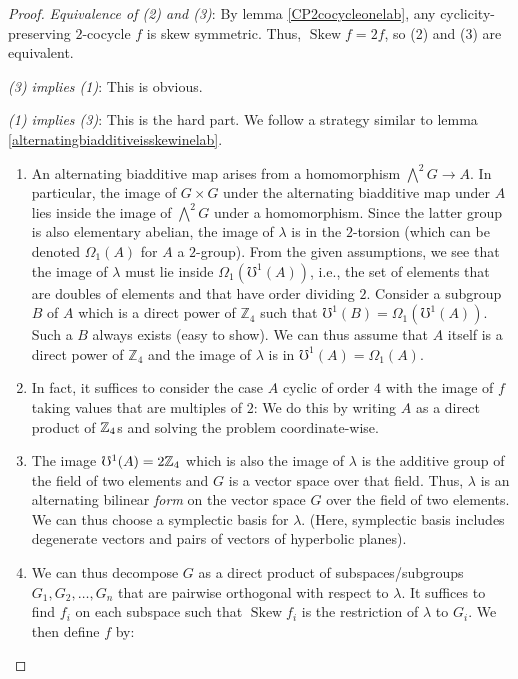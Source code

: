\documentclass[10pt]{amsart}
\newcommand{\Skew}{\operatorname{Skew}}
\begin{document}
\begin{proof}
  {\em Equivalence of (2) and (3)}: By lemma \ref{CP2cocycleonelab},
  any cyclicity-preserving $2$-cocycle $f$ is skew symmetric. Thus,
  $\Skew f = 2f$, so (2) and (3) are equivalent.

  {\em (3) implies (1)}: This is obvious.

  {\em (1) implies (3)}: This is the hard part. We follow a strategy
  similar to lemma \ref{alternatingbiadditiveisskewinelab}.   

  \begin{enumerate}
  \item An alternating biadditive map arises from a homomorphism
    $\bigwedge^2G \to A$. In particular, the image of $G \times G$
    under the alternating biadditive map under $A$ lies inside the
    image of $\bigwedge^2G$ under a homomorphism. Since the latter
    group is also elementary abelian, the image of $\lambda$ is in the
    $2$-torsion (which can be denoted $\Omega_1(A)$ for $A$ a
    $2$-group). From the given assumptions, we see that the image of
    $\lambda$ must lie inside $\Omega_1(\mho^1(A))$, i.e., the set of
    elements that are doubles of elements and that have order dividing
    $2$. Consider a subgroup $B$ of $A$ which is a direct power of
    $\mathbb{Z}_4$ such that $\mho^1(B) = \Omega_1(\mho^1(A))$. Such a
    $B$ always exists (easy to show). We can thus assume that $A$
    itself is a direct power of $\mathbb{Z}_4$ and the image of
    $\lambda$ is in $\mho^1(A) = \Omega_1(A)$.
  \item In fact, it suffices to consider the case $A$ cyclic of order
    $4$ with the image of $f$ taking values that are multiples of $2$:
    We do this by writing $A$ as a direct product of $\mathbb{Z}_4$s and
    solving the problem coordinate-wise.
   \item The image $\mho^1(A) = 2\mathbb{Z}_4$ which is also the image of
    $\lambda$ is the additive group of the field of two elements and
    $G$ is a vector space over that field. Thus, $\lambda$ is an
    alternating bilinear {\em form} on the vector space $G$ over the
    field of two elements. We can thus choose a symplectic basis for
    $\lambda$. (Here, symplectic basis includes degenerate vectors and
    pairs of vectors of hyperbolic planes).
  \item We can thus decompose $G$ as a direct product of
    subspaces/subgroups $G_1, G_2, \dots, G_n$ that are pairwise
    orthogonal with respect to $\lambda$. It suffices to find $f_i$ on
    each subspace such that $\Skew f_i$ is the restriction of
    $\lambda$ to $G_i$. We then define $f$ by:


\end{enumerate}
\end{proof}
\end{document}
